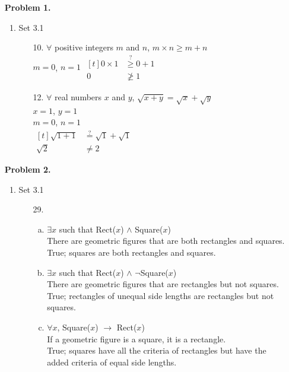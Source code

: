 \documentclass[letterpaper,fleqn]{article}
\begin{document}
	\begin{enumerate} 
		\item [] \textbf{Problem 1.}
		\begin{enumerate}[]
			\item Set 3.1
			\begin{enumerate}
				\item [10.]
				$\forall$ positive integers $m$ and $n$, $m \times n \geq m + n$ \\
				$m=0$, $n=1$
				$\begin{aligned}[t]
					0 \times 1 & \stackrel{?}{\geq} 0 + 1 \\
					0 & \not\geq 1
				\end{aligned}$
				
				\item [12.]
				$\forall$ real numbers $x$ and $y$, $\sqrt{x+y} = \sqrt{x}+\sqrt{y}$ \\
				$x=1$, $y=1$ \\
				$m=0$, $n=1$ \\
				$\begin{aligned}[t]
					\sqrt{1+1} & \stackrel{?}{=} \sqrt{1}+\sqrt{1} \\
					\sqrt{2} & \not= 2
				\end{aligned}$
				
			\end{enumerate}
		\end{enumerate}
		
		\item [] \textbf{Problem 2.}
		\begin{enumerate}[]
			\item Set 3.1
			\begin{enumerate}
				\item [29.] \quad
				\begin{enumerate}[(a)]
					\item
					$\exists x$ such that Rect($x$) $\wedge$ Square($x$) \\
					There are geometric figures that are both rectangles and squares. \\
					True; squares are both rectangles and squares.
					\item
					$\exists x$ such that Rect($x$) $\wedge$ $\neg$Square($x$) \\ 
					There are geometric figures that are rectangles but not squares. \\
					True; rectangles of unequal side lengths are rectangles but not squares.
					\item
					$\forall x$, Square($x$) $\rightarrow$ Rect($x$) \\
					If a geometric figure is a square, it is a rectangle. \\
					True; squares have all the criteria of rectangles but have the added criteria of equal side lengths.
				\end{enumerate}
			\end{enumerate}
		\end{enumerate}
		

\end{enumerate}
\end{document}
